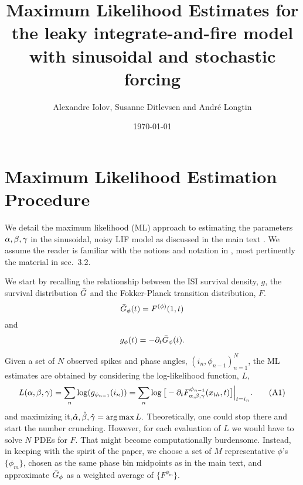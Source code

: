 \documentclass{article}
\begin{document}
\title{Maximum Likelihood Estimates for the  leaky integrate-and-fire model with
sinusoidal and stochastic forcing}

\author{Alexandre Iolov, Susanne Ditlevsen and Andr\'e Longtin }
 
\date{\today}

\maketitle


\vskip 20pt

\section{Maximum Likelihood Estimation Procedure}
We detail the maximum likelihood (ML) approach to estimating the parameters
${{\alpha},{\beta},{\gamma } }$ in the sinusoidal, noisy LIF model as discussed in the main text
\cite{Iolov2013}. We assume the reader is familiar with the notions and notation
in \cite{Iolov2013}, most pertinently the material in sec.\ 3.2.

We start by recalling the relationship between the ISI survival density, $g$,
the survival distribution ${ \bar{G} }$ and the Fokker-Planck transition distribution,
$F$. $${ \bar{G} }_{\phi}(t) = F^{(\phi)}(1,t)$$ and $$g_{\phi}( t)  = -{\partial}_t
{ \bar{G} }_{\phi}(t). $$

Given a set of $N$ observed spikes and phase angles, $(i_n,
\phi_{n-1})_{n=1}^N$, the ML estimates are obtained by considering the
log-likelihood function, $L$,
\begin{equation}
 L({\alpha},{\beta},{\gamma }) = \sum_n  \log (
g_{\phi_{n-1}}(i_n) ) = \sum_n \log \big[ -{\partial}_t F^{\phi_{n-1}}_{{\alpha},{\beta},{\gamma }}({ x_{th} }, t) \big] \Big|_{t =
i_n}. 
\label{eq:loss_function_MLE}
\tag{A1}
\end{equation}
and maximizing it,$\abgest = \argmax L.$
Theoretically, one could stop there and start the number crunching. However, for
each evaluation of $L$ we would have to solve $N$ PDEs for $F$. That might
become computationally burdensome. Instead, in keeping with the spirit of the
paper, we choose a set of $M$ representative $\phi$'s $\{\phi_m\}$, chosen as
the same phase bin midpoints as in the main text, and approximate ${ \bar{G} }_\phi$ as
a weighted average of $\{F^{\phi_m} \}$.
\end{document}
